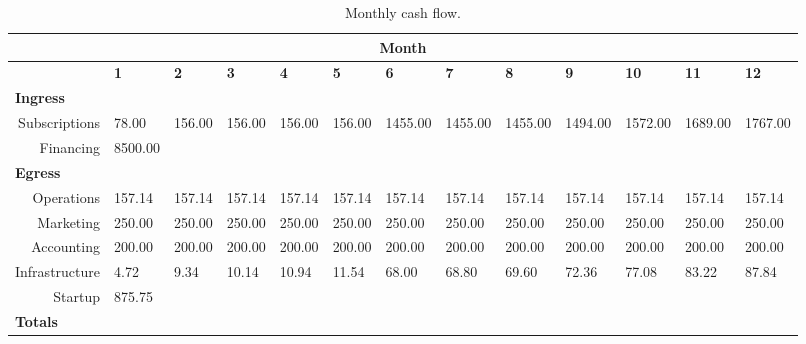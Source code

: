 \begin{sidewaystable}
\begin{table}[H]
  \caption{Monthly cash flow.}

  \begin{tabularx}{\textwidth}{X X X X X X X X X X X X X}

    \multicolumn{13}{c}{\textbf{Month}} \\

    \hline
    
    \multicolumn{1}{c}{} & \textbf{1} & \textbf{2} & \textbf{3} & \textbf{4} & \textbf{5} & \textbf{6} & \textbf{7} & \textbf{8} & \textbf{9} & \textbf{10} & \textbf{11} & \textbf{12}  \\

    \hline

    \multicolumn{13}{l}{\textbf{Ingress}} \\

    \hline

    \multicolumn{1}{r}{Subscriptions} & 78.00 & 156.00 & 156.00 & 156.00  & 156.00  & 1455.00  & 1455.00  & 1455.00  & 1494.00  & 1572.00  & 1689.00  & 1767.00  \\
    \multicolumn{1}{r}{Financing} & 8500.00 &  &  &  &  & &  &  &  &  &  &  \\

    \hline

    \multicolumn{13}{l}{\textbf{Egress}} \\

    \hline

    \multicolumn{1}{r}{Operations} & 157.14 & 157.14 & 157.14 & 157.14 & 157.14 & 157.14 & 157.14 & 157.14 & 157.14 & 157.14 & 157.14 & 157.14  \\
    \multicolumn{1}{r}{Marketing} & 250.00 & 250.00 & 250.00 & 250.00 & 250.00 & 250.00 & 250.00 & 250.00 & 250.00 & 250.00 & 250.00 & 250.00  \\
    \multicolumn{1}{r}{Accounting} & 200.00 & 200.00 & 200.00 & 200.00 & 200.00 & 200.00 & 200.00 & 200.00 & 200.00 & 200.00 & 200.00 & 200.00  \\
    \multicolumn{1}{r}{Infrastructure} & 4.72 & 9.34 & 10.14 & 10.94 & 11.54 & 68.00 & 68.80 & 69.60 & 72.36 & 77.08 & 83.22 & 87.84  \\
    \multicolumn{1}{r}{Startup} & 875.75 &  &  &  &  &  &  &  &  &  &  &   \\

    \hline

    \multicolumn{13}{l}{\textbf{Totals}} \\


\end{tabularx}
\end{table}
\end{sidewaystable}
